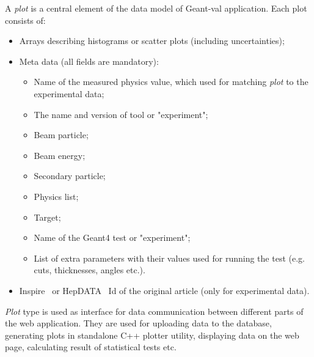A \textit{plot} is a central element of the data model of \textsf{Geant-val} application. Each plot consists of:
\begin{itemize}
    \item Arrays describing histograms or scatter plots (including uncertainties);
    \item Meta data (all fields are mandatory):
    \begin{itemize}
        \item Name of the measured physics value, which used for matching \textit{plot} to the experimental data;
        \item The name and version of tool or "experiment";
        \item Beam particle;
        \item Beam energy;
        \item Secondary particle;
        \item Physics list;
        \item Target;
        \item Name of the Geant4 test or "experiment";
        \item List of extra parameters with their values used for running the test (e.g. cuts, thicknesses, angles etc.).
    \end{itemize}
    \item Inspire~\cite{inspire} or HepDATA~\cite{hepdata} Id of the original article (only for experimental data).
\end{itemize}

\textit{Plot} type is used as interface for data communication between different parts of the web application. They are used for uploading data to the database, generating plots in standalone C++ plotter utility, displaying data on the web page, calculating result of statistical tests etc.